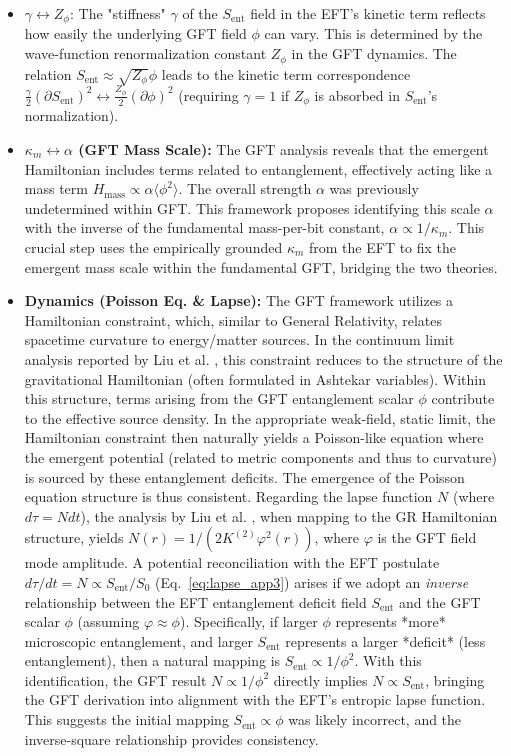\documentclass[11pt]{article}
\begin{document}
\begin{itemize}
    \item \textbf{$\gamma \leftrightarrow Z_\phi$}: The "stiffness" $\gamma$ of the $S_{\mathrm{ent}}$ field in the EFT's kinetic term reflects how easily the underlying GFT field $\phi$ can vary. This is determined by the wave-function renormalization constant $Z_\phi$ in the GFT dynamics. The relation $S_{\mathrm{ent}} \approx \sqrt{Z_\phi}\phi$ leads to the kinetic term correspondence $\frac{\gamma}{2}(\partial S_{\mathrm{ent}})^2 \leftrightarrow \frac{Z_\phi}{2}(\partial \phi)^2$ (requiring $\gamma=1$ if $Z_\phi$ is absorbed in $S_{\mathrm{ent}}$'s normalization).
    \item \textbf{$\kappa_m \leftrightarrow \alpha$ (GFT Mass Scale):} The GFT analysis reveals that the emergent Hamiltonian includes terms related to entanglement, effectively acting like a mass term $H_{\mathrm{mass}} \propto \alpha \langle \phi^2 \rangle$. The overall strength $\alpha$ was previously undetermined within GFT. This framework proposes identifying this scale $\alpha$ with the inverse of the fundamental mass-per-bit constant, $\alpha \propto 1/\kappa_m$. This crucial step uses the empirically grounded $\kappa_m$ from the EFT to fix the emergent mass scale within the fundamental GFT, bridging the two theories.
\item \textbf{Dynamics (Poisson Eq. \& Lapse):} The GFT framework utilizes a Hamiltonian constraint, which, similar to General Relativity, relates spacetime curvature to energy/matter sources. In the continuum limit analysis reported by Liu et al. \cite{Liu2023}, this constraint reduces to the structure of the gravitational Hamiltonian (often formulated in Ashtekar variables). Within this structure, terms arising from the GFT entanglement scalar $\phi$ contribute to the effective source density. In the appropriate weak-field, static limit, the Hamiltonian constraint then naturally yields a Poisson-like equation where the emergent potential (related to metric components and thus to curvature) is sourced by these entanglement deficits. The emergence of the Poisson equation structure is thus consistent.
 Regarding the lapse function $N$ (where $d\tau = N dt$), the analysis by Liu et al. \cite{Liu2023}, when mapping to the GR Hamiltonian structure, yields $N(r) = 1/(2K^{(2)}\varphi^2(r))$, where $\varphi$ is the GFT field mode amplitude. A potential reconciliation with the EFT postulate $d\tau/dt = N \propto S_{\mathrm{ent}}/S_0$ (Eq.~\eqref{eq:lapse_app3}) arises if we adopt an \emph{inverse} relationship between the EFT entanglement deficit field $S_{\mathrm{ent}}$ and the GFT scalar $\phi$ (assuming $\varphi \approx \phi$). Specifically, if larger $\phi$ represents *more* microscopic entanglement, and larger $S_{\mathrm{ent}}$ represents a larger *deficit* (less entanglement), then a natural mapping is $S_{\mathrm{ent}} \propto 1/\phi^2$. With this identification, the GFT result $N \propto 1/\phi^2$ directly implies $N \propto S_{\mathrm{ent}}$, bringing the GFT derivation into alignment with the EFT's entropic lapse function. This suggests the initial mapping $S_{\mathrm{ent}} \propto \phi$ was likely incorrect, and the inverse-square relationship provides consistency.

\end{itemize}
\end{document}
